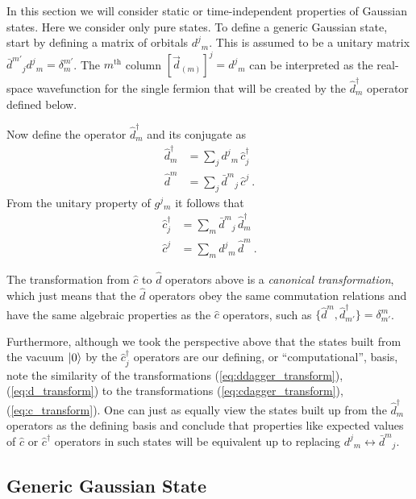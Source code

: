 \documentclass[aps, superscriptaddress, floatfix, onecolumn]{revtex4-2}
\begin{document}
In this section we will consider static or time-independent properties of Gaussian states. Here we consider only pure states. 
To define a generic Gaussian state, start by defining a matrix of orbitals $d^{j}\!_m$.
This is assumed to be a unitary matrix $\bar{d}^{m'}\!_j d^j\!_m = \delta^{m'}_m$.
The $m^\text{th}$ column $[\vec{d}_{(m)}]^{j} = d^{j}\!_m$ can be interpreted as the real-space wavefunction
for the single fermion that will be created by the $\hat{d}^\dagger_m$ operator defined below.

Now define the operator $\hat{d}^\dagger_m$ and its conjugate as
\begin{align}
\hat{d}^\dagger_m & = \sum_j d^j\!_m \, \hat{c}^\dagger_j \label{eq:ddagger_transform} \\
\hat{d}^m & = \sum_j \bar{d}^m\!_j \, \hat{c}^j  \ . \label{eq:d_transform}
\end{align}
From the unitary property of $g^j\!_m$ it follows that 
\begin{align}
\hat{c}^\dagger_j & = \sum_m \bar{d}^m\!_j \, \hat{d}^\dagger_m \label{eq:cdagger_transform} \\
\hat{c}^j & = \sum_m d^j\!_m \, \hat{d}^m  \ . \label{eq:c_transform}
\end{align}

The transformation from $\hat{c}$ to $\hat{d}$ operators above is a \emph{canonical transformation}, which just means that the $\hat{d}$ operators obey the same commutation relations and have the same algebraic properties as the $\hat{c}$ operators, such as \mbox{$\{ \hat{d}^m, \hat{d}^\dagger_{m'} \} = \delta^m_{m'}$}. 

Furthermore, although we took the perspective above that the states built from the vacuum $\ket{0}$ by the $\hat{c}^\dagger_j$ operators are our defining, or ``computational'', basis, note the similarity of the transformations (\ref{eq:ddagger_transform}), (\ref{eq:d_transform}) to the transformations (\ref{eq:cdagger_transform}), (\ref{eq:c_transform}). One can just as equally view the states built up from the $\hat{d}^\dagger_m$ operators as the defining basis and conclude that properties like expected values of $\hat{c}$ or $\hat{c}^\dagger$ operators in such states will be equivalent up to replacing $d^j\!_m \leftrightarrow \bar{d}^m\!_j$.

\subsection{Generic Gaussian State}
\end{document}
